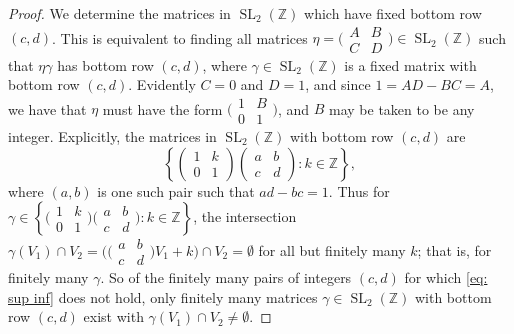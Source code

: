 \documentclass[10pt,leqno]{article}
\theoremstyle{plain}
\theoremstyle{definition}
\numberwithin{equation}{section}
\numberwithin{lem}{section}
\newcommand{\cbr}[1]{\left\{#1\right\}}
\DeclareMathOperator{\SL}{SL}
\newcommand{\slz}{\SL_2(\mathbb{Z})}
\begin{document}
\begin{proof}
    We determine the matrices in $\slz$ which have fixed bottom row $(c,d)$. This is equivalent to finding all matrices $\eta = \big(\!\begin{smallmatrix}
        A & B \\ C & D
    \end{smallmatrix}\!\big)\in \slz$ such that $\eta\gamma$ has bottom row $(c,d)$, where $\gamma\in \slz$ is a fixed matrix with  bottom row $(c,d)$. Evidently $C=0$ and $D = 1$, and since $1 = AD - BC = A$, we have that $\eta$ must have the form $\big(\!\begin{smallmatrix}
        1 & B \\ 0  & 1
    \end{smallmatrix}\!\big)$, and $B$ may be taken to be any integer. Explicitly, the matrices in $\slz$ with bottom row $(c,d)$ are \[\cbr{\begin{pmatrix}
        1 & k \\ 0 & 1
    \end{pmatrix}\begin{pmatrix}
        a & b \\ c & d
    \end{pmatrix}: k\in \mathbb{Z}},\]
    where $(a,b)$ is one such pair such that $ad-bc = 1$. Thus for $\gamma\in \cbr{\big(\!\begin{smallmatrix}
        1 & k \\ 0 & 1
    \end{smallmatrix}\!\big)\big(\!\begin{smallmatrix}
        a & b \\ c & d
    \end{smallmatrix}\!\big): k\in \mathbb{Z}}$, the intersection $\gamma(V_1)\cap V_2 = \big(\big(\!\begin{smallmatrix}
        a & b \\ c & d
    \end{smallmatrix}\!\big)V_1+ k\big)\cap V_2 =\emptyset$ for all but finitely many $k$; that is, for finitely many $\gamma$. So of the finitely many pairs of integers $(c,d)$ for which \cref{eq: sup inf} does not hold, only finitely many matrices $\gamma\in \slz$ with bottom row $(c,d)$ exist with $\gamma(V_1)\cap V_2\neq \emptyset$.


\end{proof}
\end{document}
